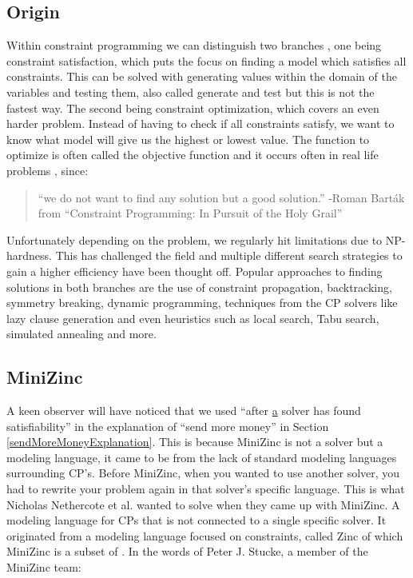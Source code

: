 \subsection{Origin}
Within constraint programming we can distinguish two branches \cite{52bartak1999constraint}, one being constraint satisfaction, which puts the focus on finding a model which satisfies all constraints. This can be solved with generating values within the domain of the variables and testing them, also called generate and test but this is not the fastest way. 
The second being constraint optimization, which covers an even harder problem. Instead of having to check if all constraints satisfy, we want to know what model will give us the highest or lowest value. The function to optimize is often called the objective function and it occurs often in real life problems \cite{52bartak1999constraint}, since:
\begin{quote}
	 “we do not want to find any solution but a good solution.” \newline
	 -Roman Bart\'ak from “Constraint Programming: In Pursuit of the Holy Grail” \cite{52bartak1999constraint}
\end{quote}
Unfortunately depending on the problem, we regularly hit limitations due to NP-hardness. This has challenged the field and multiple different search strategies to gain a higher efficiency have been thought off. Popular approaches to finding solutions in both branches are the use of constraint propagation, backtracking, symmetry breaking, dynamic programming, techniques from the CP solvers like lazy clause generation and even heuristics such as local search, Tabu search, simulated annealing and more. 

\subsection{MiniZinc}
A keen observer will have noticed that we used “after \underline{a} solver has found satisfiability” in the explanation of “send more money” in Section \ref{sendMoreMoneyExplanation}. 
This is because MiniZinc is not a solver but a modeling language, it came to be from the lack of standard modeling languages surrounding CP’s. Before MiniZinc, when you wanted to use another solver, you had to rewrite your problem again in that solver’s specific language. This is what Nicholas Nethercote et al. \cite{57nethercote2007minizinc} wanted to solve when they came up with MiniZinc. A modeling language for CPs that is not connected to a single specific solver. It originated from a modeling language focused on constraints, called Zinc \cite{68incbanda2006modelling} of which MiniZinc is a subset of \cite{57nethercote2007minizinc}.
In the words of Peter J. Stucke, a member of the MiniZinc team:

